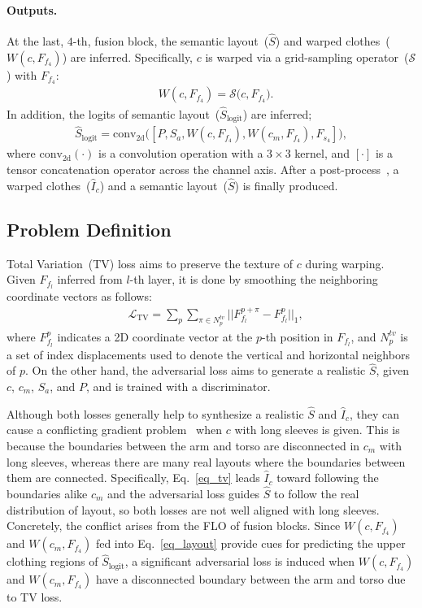 \documentclass[letterpaper]{article} %
\begin{document}
\paragraph{Outputs.} At the last, $4$-th, fusion block, the semantic layout~($\hat{S}$) and warped clothes~($W(c,F_{f_{4}})$) are inferred. Specifically, $c$ is warped via a grid-sampling operator~($\mathcal{S}$) with $F_{f_{4}}$:
\begin{eqnarray}
     & W(c,F_{f_{4}}) = \mathcal{S}\big(c, F_{f_{4}} \big).
\end{eqnarray}
In addition, the logits of semantic layout~($\hat{S}_{\text{logit}}$) are inferred;
\begin{eqnarray}
    \hat{S}_{\text{logit}} = \text{conv}_{\text{2d}}\big( [ P, S_a, W(c,F_{f_{4}}), W(c_m,F_{f_{4}}), F_{s_4} ] \big),
    \label{eq_layout}
\end{eqnarray}
where $\text{conv}_{\text{2d}}(\cdot)$ is a convolution operation with a $3\times 3$ kernel, and $[\cdot]$ is a tensor concatenation operator across the channel axis. After a post-process~\cite{lee2022hrviton}, a warped clothes~($\hat{I}_c$) and a semantic layout~($\hat{S}$) is finally produced.

\subsection{Problem Definition}
Total Variation~(TV) loss aims to preserve the texture of $c$ during warping.
Given $F_{f_l}$ inferred from $l$-th layer, it is done by smoothing the neighboring coordinate vectors as follows:
\begin{eqnarray}
    & \mathcal{L}_{\text{TV}} = \sum\limits_{p} \sum\limits_{\pi \in N_p^{tv}} ||F_{f_l}^{p+\pi} - F_{f_l}^p ||_1 ,
    \label{eq_tv}
\end{eqnarray}
where $F_{f_l}^p$ indicates a 2D coordinate vector at the $p$-th position in $F_{f_l}$, and $N_p^{tv}$ is a set of index displacements used to denote the vertical and horizontal neighbors of $p$.
On the other hand, the adversarial loss aims to generate a realistic $\hat{S}$, given $c$, $c_m$, $S_a$, and $P$, and is trained with a discriminator.

Although both losses generally help to synthesize a realistic $\hat{S}$ and $\hat{I}_c$, they can cause a conflicting gradient problem~\cite{shi2023recon} when $c$ with long sleeves is given. This is because the boundaries between the arm and torso are disconnected in $c_m$ with long sleeves, whereas there are many real layouts where the boundaries between them are connected.
Specifically, Eq.~\ref{eq_tv} leads $\hat{I}_c$ toward following the boundaries alike $c_m$ and the adversarial loss guides $\hat{S}$ to follow the real distribution of layout, so both losses are not well aligned with long sleeves. 
Concretely, the conflict arises from the FLO of fusion blocks.
Since $W(c,F_{f_4})$ and $W(c_m,F_{f_4})$ fed into Eq.~\ref{eq_layout} provide cues for predicting the upper clothing regions of $\hat{S}_{\text{logit}}$, a significant adversarial loss is induced when $W(c,F_{f_4})$ and $W(c_m,F_{f_4})$ have a disconnected boundary between the arm and torso due to TV loss.
\end{document}
